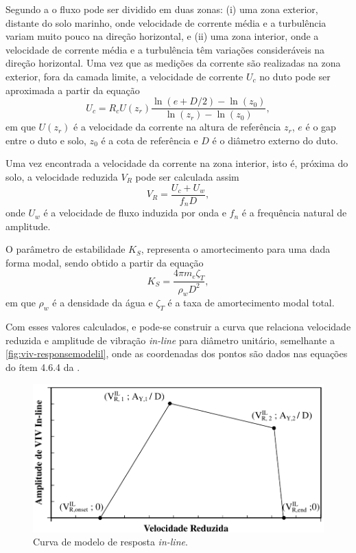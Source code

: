 Segundo a  o fluxo pode ser dividido em duas zonas: (i) uma zona exterior, distante do solo marinho, onde velocidade de corrente média e a turbulência variam muito pouco na direção horizontal, e (ii) uma zona interior, onde a velocidade de corrente média e a turbulência têm variações consideráveis na direção horizontal. Uma vez que as medições da corrente são realizadas na zona exterior, fora da camada limite, a velocidade de corrente $U_c$ no duto pode ser aproximada a partir da equação
\begin{equation}
\label{eq:vel-corrente}
U_c = R_c U(z_r) \frac{\ln{(e+D/2)} - \ln(z_0)}{\ln (z_r)- \ln (z_0)},
\end{equation}
em que $U(z_r)$ é a velocidade da corrente na altura de referência $z_r$, $e$ é o gap entre o duto e solo, $z_0$ é a cota de referência e $D$ é o diâmetro externo do duto.

Uma vez encontrada a velocidade da corrente na zona interior, isto é, próxima do solo, a velocidade reduzida $V_R$ pode ser calculada assim
\begin{equation}
\label{eq:viv-Vr}
V_R = \frac{U_c + U_w}{f_n D},
\end{equation}
onde $U_w$ é a velocidade de fluxo induzida por onda e $f_n$ é a frequência natural de amplitude.

O parâmetro de estabilidade $K_S$, representa o amortecimento para uma dada forma modal, sendo obtido a partir da equação
\begin{equation}
\label{eq:viv-Ks}
K_S = \frac{4 \pi m_e \zeta_T}{\rho_w D^2},
\end{equation}
em que $\rho_w$ é a densidade da água e $\zeta_T$ é a taxa de amortecimento modal total.

Com esses valores calculados, e pode-se construir a curva que relaciona velocidade reduzida e amplitude de vibração \textit{in-line} para diâmetro unitário, semelhante a \autoref{fig:viv-responsemodelil}, onde as coordenadas dos pontos são dados nas equações do ítem 4.6.4 da .

\begin{figure}[!ht]
    \centering
    \caption{Curva de modelo de resposta \textit{in-line}.}\label{fig:viv-responsemodelil}
    \includegraphics[width=0.65\linewidth]{imagens/response_model_IL}
\end{figure}

